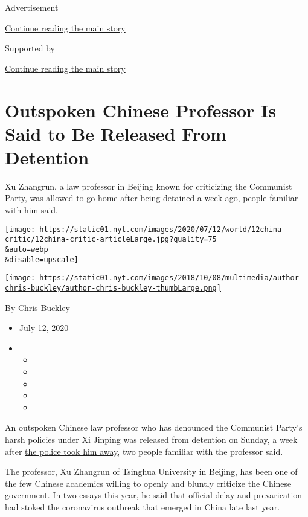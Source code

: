 Advertisement

\protect\hyperlink{after-top}{Continue reading the main story}

Supported by

\protect\hyperlink{after-sponsor}{Continue reading the main story}

\hypertarget{outspoken-chinese-professor-is-said-to-be-released-from-detention}{%
\section{Outspoken Chinese Professor Is Said to Be Released From
Detention}\label{outspoken-chinese-professor-is-said-to-be-released-from-detention}}

Xu Zhangrun, a law professor in Beijing known for criticizing the
Communist Party, was allowed to go home after being detained a week ago,
people familiar with him said.

\texttt{[image: https://static01.nyt.com/images/2020/07/12/world/12china-critic/12china-critic-articleLarge.jpg?quality=75\\\&auto=webp\\\&disable=upscale]}

\href{https://www.nytimes.com/by/chris-buckley}{\texttt{[image: https://static01.nyt.com/images/2018/10/08/multimedia/author-chris-buckley/author-chris-buckley-thumbLarge.png]}}

By \href{https://www.nytimes.com/by/chris-buckley}{Chris Buckley}

\begin{itemize}
\item
  July 12, 2020
\item
  \begin{itemize}
  \item
  \item
  \item
  \item
  \item
  \end{itemize}
\end{itemize}

An outspoken Chinese law professor who has denounced the Communist
Party's harsh policies under Xi Jinping was released from detention on
Sunday, a week after
\href{https://www.nytimes.com/2020/07/06/world/asia/china-detains-xu-zhangrun-critic.html}{the
police took him away}, two people familiar with the professor said.

The professor, Xu Zhangrun of Tsinghua University in Beijing, has been
one of the few Chinese academics willing to openly and bluntly criticize
the Chinese government. In two
\href{https://www.chinafile.com/reporting-opinion/viewpoint/viral-alarm-when-fury-overcomes-fear}{essays
this year}, he said that official delay and prevarication had stoked the
coronavirus outbreak that emerged in China late last year.

